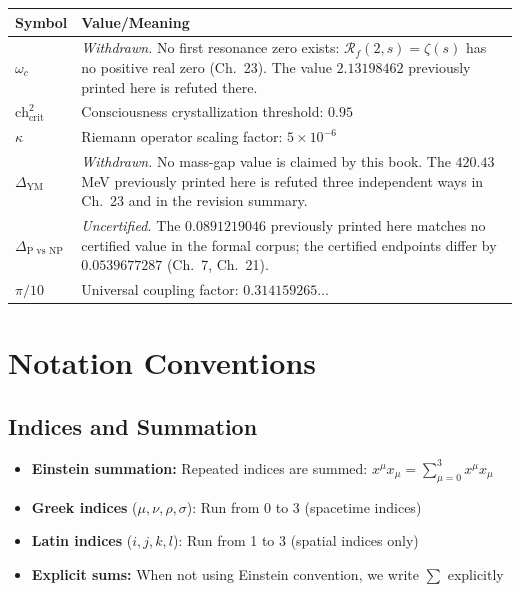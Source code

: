 \begin{center}
\begin{tabular}{ll}
\toprule
\textbf{Symbol} & \textbf{Value/Meaning} \\
\midrule
$\omega_c$ & \emph{Withdrawn.} No first resonance zero exists:
  $\mathcal{R}_f(2,s) = \zeta(s)$ has no positive real zero (Ch.~23). The
  value $2.13198462$ previously printed here is refuted there. \\
$\text{ch}^2_{\text{crit}}$ & Consciousness crystallization threshold: $0.95$ \\
$\kappa$ & Riemann operator scaling factor: $5 \times 10^{-6}$ \\
$\Delta_{\text{YM}}$ & \emph{Withdrawn.} No mass-gap value is claimed by
  this book. The $420.43$ MeV previously printed here is refuted three
  independent ways in Ch.~23 and in the revision summary. \\
$\Delta_{\text{P vs NP}}$ & \emph{Uncertified.} The $0.0891219046$
  previously printed here matches no certified value in the formal corpus; the
  certified endpoints differ by $0.0539677287$ (Ch.~7, Ch.~21). \\
$\pi/10$ & Universal coupling factor: $0.314159265...$ \\
\bottomrule
\end{tabular}
\end{center}

\section*{Notation Conventions}

\subsection*{Indices and Summation}

\begin{itemize}
\item \textbf{Einstein summation:} Repeated indices are summed: $x^\mu x_\mu = \sum_{\mu=0}^{3} x^\mu x_\mu$
\item \textbf{Greek indices} ($\mu, \nu, \rho, \sigma$): Run from 0 to 3 (spacetime indices)
\item \textbf{Latin indices} ($i, j, k, l$): Run from 1 to 3 (spatial indices only)
\item \textbf{Explicit sums:} When not using Einstein convention, we write $\sum$ explicitly
\end{itemize}

